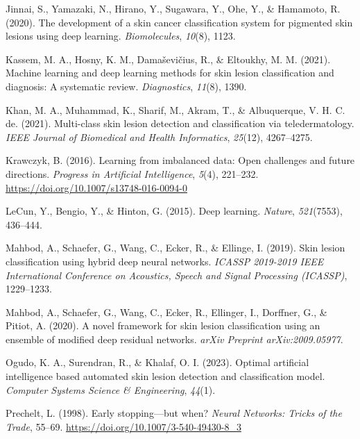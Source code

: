 \documentclass[
  12pt,
  oneside]{article}
\newlength{\cslhangindent}
\newenvironment{CSLReferences}[2] %
 {\begin{list}{}{%
  \setlength{\itemindent}{0pt}
  \setlength{\leftmargin}{0pt}
  \setlength{\parsep}{0pt}
  \ifodd #1
   \setlength{\leftmargin}{\cslhangindent}
   \setlength{\itemindent}{-1\cslhangindent}
  \fi
  \setlength{\itemsep}{#2\baselineskip}}}
 {\end{list}}
\begin{document}
\begin{CSLReferences}{1}{0}
Jinnai, S., Yamazaki, N., Hirano, Y., Sugawara, Y., Ohe, Y., \&
Hamamoto, R. (2020). The development of a skin cancer classification
system for pigmented skin lesions using deep learning.
\emph{Biomolecules}, \emph{10}(8), 1123.

Kassem, M. A., Hosny, K. M., Damaševičius, R., \& Eltoukhy, M. M.
(2021). Machine learning and deep learning methods for skin lesion
classification and diagnosis: A systematic review. \emph{Diagnostics},
\emph{11}(8), 1390.

Khan, M. A., Muhammad, K., Sharif, M., Akram, T., \& Albuquerque, V. H.
C. de. (2021). Multi-class skin lesion detection and classification via
teledermatology. \emph{IEEE Journal of Biomedical and Health
Informatics}, \emph{25}(12), 4267--4275.

Krawczyk, B. (2016). Learning from imbalanced data: Open challenges and
future directions. \emph{Progress in Artificial Intelligence},
\emph{5}(4), 221--232. \url{https://doi.org/10.1007/s13748-016-0094-0}

LeCun, Y., Bengio, Y., \& Hinton, G. (2015). Deep learning.
\emph{Nature}, \emph{521}(7553), 436--444.

Mahbod, A., Schaefer, G., Wang, C., Ecker, R., \& Ellinge, I. (2019).
Skin lesion classification using hybrid deep neural networks.
\emph{ICASSP 2019-2019 IEEE International Conference on Acoustics,
Speech and Signal Processing (ICASSP)}, 1229--1233.

Mahbod, A., Schaefer, G., Wang, C., Ecker, R., Ellinger, I., Dorffner,
G., \& Pitiot, A. (2020). A novel framework for skin lesion
classification using an ensemble of modified deep residual networks.
\emph{arXiv Preprint arXiv:2009.05977}.

Ogudo, K. A., Surendran, R., \& Khalaf, O. I. (2023). Optimal artificial
intelligence based automated skin lesion detection and classification
model. \emph{Computer Systems Science \& Engineering}, \emph{44}(1).

Prechelt, L. (1998). Early stopping---but when? \emph{Neural Networks:
Tricks of the Trade}, 55--69.
\url{https://doi.org/10.1007/3-540-49430-8_3}


\end{CSLReferences}
\end{document}
